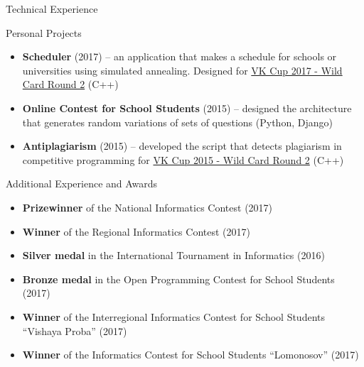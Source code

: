\documentclass[]{mcdowellcv}
\begin{document}
	\begin{cvsection}{Technical Experience}
		\begin{cvsubsection}{Personal Projects}{}{}
			\begin{itemize}
                            \item \textbf{Scheduler} (2017) -- an application that makes a schedule for schools or universities using simulated annealing. Designed for \href{https://codeforces.com/contest/775/problem/A}{VK Cup 2017 - Wild Card Round 2} (C++)
                                \item \textbf{Online Contest for School Students} (2015) -- designed the architecture that generates random variations of sets of questions (Python, Django)
                                \item \textbf{Antiplagiarism} (2015) -- developed the script that detects plagiarism in competitive programming for \href{https://codeforces.com/contest/537/problem/A}{VK Cup 2015 - Wild Card Round 2} (C++)
			\end{itemize}
		\end{cvsubsection}
	\end{cvsection}

	\begin{cvsection}{Additional Experience and Awards}
            \vskip 0.1cm
		\begin{cvsubsection}{}{}{}
			\begin{itemize}
                            \item \textbf{Prizewinner} of the National Informatics Contest (2017)
                            \item \textbf{Winner} of the Regional Informatics Contest (2017)
                            \item \textbf{Silver medal} in the International Tournament in Informatics (2016)
                            \item \textbf{Bronze medal} in the Open Programming Contest for School Students (2017)
                            \item \textbf{Winner} of the Interregional Informatics Contest for School Students ``Vishaya Proba'' (2017)
                            \item \textbf{Winner} of the Informatics Contest for School Students ``Lomonosov'' (2017)
			\end{itemize}
		\end{cvsubsection}
	\end{cvsection}
\end{document}
